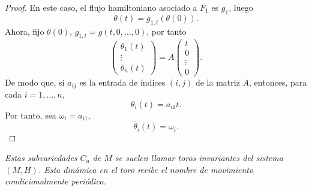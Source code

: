 \begin{proof}
En este caso, el flujo hamiltoniano asociado a $F_1$ es $g_1$, luego 
\[
\theta(t) = g_{1,t} (\theta(0)).
\]
Ahora, fijo $\theta(0)$, $g_{1,t}=g(t,0,\dots,0)$, por tanto
\[
\left(
\begin{array}{c}
\theta_1 (t)\\
\vdots \\
\theta_n (t)
\end{array}
\right)
=
A
\left(
\begin{array}{c}
t\\
0 \\
\vdots \\
0
\end{array}
\right).
\]
De modo que, si $a_{ij}$ es la entrada de índices $(i,j)$ de la matriz $A$, entonces, para cada $i=1,\dots,n$,
\[
\theta_i (t) = a_{i1} t.
\] 
Por tanto, sea $\omega_i=a_{i1}$,
\[
\dot{\theta_i}(t)=\omega_i.
\]
\end{proof}

\begin{obs}
  \em
  Estas subvariedades $C_a$ de $M$ se suelen llamar \textit{toros invariantes} del sistema $(M,H)$. 
  Esta dinámica en el toro recibe el nombre de \emph{movimiento condicionalmente periódico}.
\end{obs}

